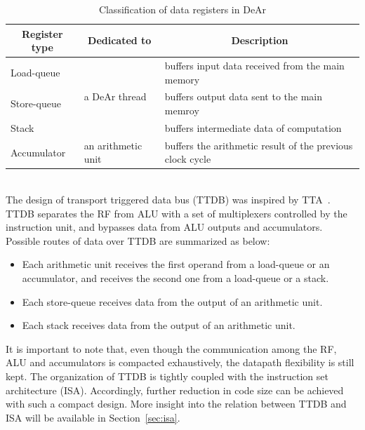 \begin{table}[!ht]
    \caption{Classification of data registers in DeAr}
    \label{tab:register}
    \centering
    \begin{tabular}{|l|l|l|}
        \hline
        \multicolumn{1}{|c|}{\textbf{Register type}} & \multicolumn{1}{c|}{\textbf{Dedicated to}} & \multicolumn{1}{c|}{\textbf{Description}}                 \\ \hline
        Load-queue                                   & \multirow{3}{*}{a DeAr thread}             & buffers input data received from the main memory          \\ \cline{1-1} \cline{3-3} 
        Store-queue                                  &                                            & buffers output data sent to the main memroy               \\ \cline{1-1} \cline{3-3} 
        Stack                                        &                                            & buffers intermediate data of computation                  \\ \hline
        Accumulator                                  & an arithmetic unit                         & buffers the arithmetic result of the previous clock cycle \\ \hline
    \end{tabular}
\end{table}
\\\indent
The design of transport triggered data bus (TTDB) was inspired by TTA~\cite{tta}.
TTDB separates the RF from ALU with a set of multiplexers controlled by the instruction unit, 
and bypasses data from ALU outputs and accumulators.
Possible routes of data over TTDB are summarized as below:
\begin{itemize}
    \item Each arithmetic unit receives the first operand from a load-queue or an accumulator, 
        and receives the second one from a load-queue or a stack.
    \item Each store-queue receives data from the output of an arithmetic unit.
    \item Each stack receives data from the output of an arithmetic unit.
\end{itemize}
\indent
It is important to note that, even though the communication among the RF, ALU and accumulators is compacted exhaustively, 
the datapath flexibility is still kept.
The organization of TTDB is tightly coupled with the instruction set architecture (ISA).
Accordingly, further reduction in code size can be achieved with such a compact design.
More insight into the relation between TTDB and ISA will be available in Section~\ref{sec:isa}.


